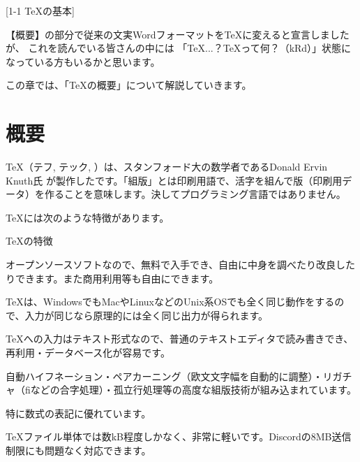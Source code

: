 \newpage
\pagestyle{leaflet}
[1-1 \TeX の基本]
\begin{multicols*}{2}
【概要】の部分で従来の文実Wordフォーマットを\TeX に変えると宣言しましたが、
これを読んでいる皆さんの中には
「\TeX ...？\TeX って何？（kRd）」状態になっている方もいるかと思います。

この章では、「\TeX の概要」について解説していきます。

\section{概要}
TeX（テフ, テック, ）は、スタンフォード大の数学者であるDonald Ervin Knuth氏
が製作したです。「組版」とは印刷用語で、活字を組んで版（印刷用データ）を作ることを意味します。決してプログラミング言語ではありません。

\TeX には次のような特徴があります。
\begin{framebox-simple}{\TeX の特徴}
    \begin{reitemize}
        \item オープンソースソフトなので、無料で入手でき、自由に中身を調べたり改良したりできます。また商用利用等も自由にできます。
        \item \TeX は、WindowsでもMacやLinuxなどのUnix系OSでも全く同じ動作をするので、入力が同じなら原理的には全く同じ出力が得られます。
        \item \TeX への入力はテキスト形式なので、普通のテキストエディタで読み書きでき、再利用・データベース化が容易です。
        \item 自動ハイフネーション・ペアカーニング（欧文文字幅を自動的に調整）・リガチャ（fiなどの合字処理）・孤立行処理等の高度な組版技術が組み込まれています。
        \item 特に数式の表記に優れています。
        \item \TeX ファイル単体では数kB程度しかなく、非常に軽いです。Discordの8MB送信制限にも問題なく対応できます。
    \end{reitemize}
\end{framebox-simple}


\end{multicols*}
